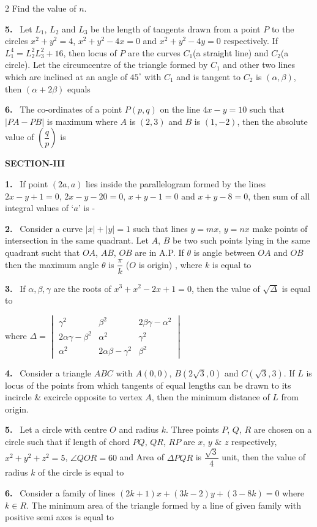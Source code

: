 \documentclass[10pt]{extarticle}
\newcommand{\sect}[1]{\par\smallskip\noindent\textbf{#1}\par}
\newcommand{\qn}[1]{\par\smallskip\noindent\textbf{#1.}~}
\begin{document}
\begin{multicols}{2}
Find the value of $n$.
\qn{5} Let $L_1$, $L_2$ and $L_3$ be the length of tangents drawn from a point $P$ to the circles $x^2+y^2=4$, $x^2+y^2-4x=0$ and $x^2+y^2-4y=0$ respectively. If $L_1^4=L_2^2L_3^2+16$, then locus of $P$ are the curves $C_1$(a straight line) and $C_2$(a circle). Let the circumcentre of the triangle formed by $C_1$ and other two lines which are inclined at an angle of $45^\circ$ with $C_1$ and is tangent to $C_2$ is $(\alpha,\beta)$, then $(\alpha+2\beta)$ equals
\qn{6} The co-ordinates of a point $P(p,q)$ on the line $4x-y=10$ such that $|PA-PB|$ is maximum where $A$ is $(2,3)$ and $B$ is $(1,-2)$, then the absolute value of $\left(\dfrac qp\right)$ is
\sect{SECTION-III}
\qn{1} If point $(2a,a)$ lies inside the parallelogram formed by the lines $2x-y+1=0$, $2x-y-20=0$, $x+y-1=0$ and $x+y-8=0$, then sum of all integral values of `$a$' is -
\qn{2} Consider a curve $|x|+|y|=1$ such that lines $y=mx$, $y=nx$ make points of intersection in the same quadrant. Let $A$, $B$ be two such points lying in the same quadrant sucht that $OA$, $AB$, $OB$ are in A.P. If $\theta$ is angle between $OA$ and $OB$ then the maximum angle $\theta$ is $\dfrac\pi k$ ($O$ is origin) , where $k$ is equal to
\qn{3} If $\alpha,\beta,\gamma$ are the roots of $x^3+x^2-2x+1=0$, then the value of $\sqrt\Delta$ is equal to \underline{\hspace{1.5cm}}

where $\Delta=\begin{vmatrix}\gamma^2&\beta^2&2\beta\gamma-\alpha^2\\2\alpha\gamma-\beta^2&\alpha^2&\gamma^2\\\alpha^2&2\alpha\beta-\gamma^2&\beta^2\end{vmatrix}$
\qn{4} Consider a triangle $ABC$ with $A(0,0)$, $B\left(2\sqrt3,0\right)$ and $C\left(\sqrt3,3\right)$. If $L$ is locus of the points from which tangents of equal lengths can be drawn to its incircle \& excircle opposite to vertex $A$, then the minimum distance of $L$ from origin.
\qn{5} Let a circle with centre $O$ and radius $k$. Three points $P$, $Q$, $R$ are chosen on a circle such that if length of chord $PQ$, $QR$, $RP$ are $x$, $y$ \& $z$ respectively, $x^2+y^2+z^2=5$, $\angle QOR=60$ and Area of $\Delta PQR$ is $\dfrac{\sqrt3}4$ unit, then the value of radius $k$ of the circle is equal to
\qn{6} Consider a family of lines $(2k+1)x+(3k-2)y+(3-8k)=0$ where $k\in R$. The minimum area of the triangle formed by a line of given family with positive semi axes is equal to
\end{multicols}
\end{document}
